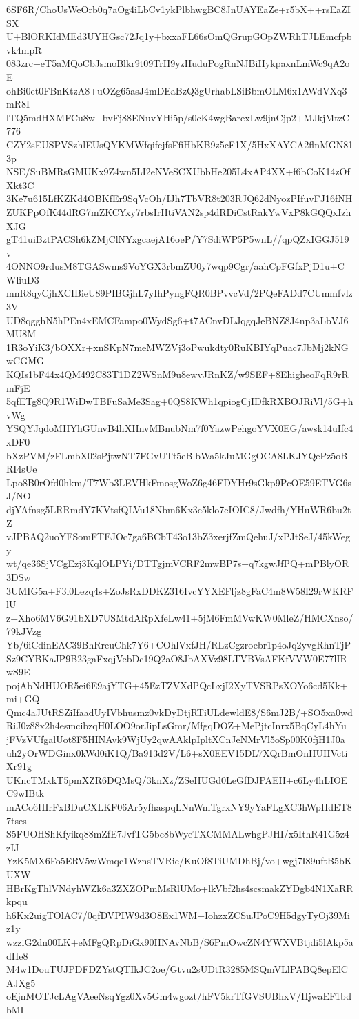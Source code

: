 6SF6R/ChoUsWeOrb0q7aOg4iLbCv1ykPlbhwgBC8JnUAYEaZe+r5bX++rsEaZISX
U+BlORKIdMEd3UYHGsc72Jq1y+bxxaFL66sOmQGrupGOpZWRhTJLEmcfpbvk4mpR
083zrc+eT5aMQoCbJsmoBlkr9t09TrH9yzHuduPogRnNJBiHykpaxnLmWc9qA2oE
ohBi0et0FBnKtzA8+uOZg65asJ4mDEaBzQ3gUrhabLSiBbmOLM6x1AWdVXq3mR8I
lTQ5mdHXMFCu8w+bvFj88ENuvYHi5p/s0cK4wgBarexLw9jnCjp2+MJkjMtzC776
CZY2sEUSPVSzhlEUsQYKMWfqifcjfsFfiHbKB9z5cF1X/5HxXAYCA2flnMGN813p
NSE/SuBMRsGMUKx9Z4wn5LI2eNVeSCXUbbHe205L4xAP4XX+f6bCoK14zOfXkt3C
3Ke7u615LfKZKd4OBKfEr9SqVcOh/IJh7TbVR8t203RJQ62dNyozPIfuvFJ16fNH
ZUKPpOfK44dRG7mZKCYxy7rbsIrHtiVAN2sp4dRDiCstRakYwVxP8kGQQxIzhXJG
gT41uiBztPACSh6kZMjClNYxgcaejA16oeP/Y7SdiWP5P5wnL//qpQZxIGGJ519v
4ONNO9rdusM8TGASwms9VoYGX3rbmZU0y7wqp9Cgr/aahCpFGfxPjD1u+CWliuD3
mnR8qyCjhXCIBieU89PIBGjhL7yIhPyngFQR0BPvvcVd/2PQeFADd7CUmmfvlz3V
UD8qgghN5hPEn4xEMCFampo0WydSg6+t7ACnvDLJqgqJeBNZ8J4np3aLbVJ6MU8M
1R3oYiK3/bOXXr+xnSKpN7meMWZVj3oPwukdty0RuKBIYqPuac7JbMj2kNGwCGMG
KQIs1bF44x4QM492C83T1DZ2WSnM9u8ewvJRnKZ/w9SEF+8EhigheoFqR9rRmFjE
5qfETg8Q9R1WiDwTBFuSaMe3Sag+0QS8KWh1qpiogCjIDfkRXBOJRiVl/5G+hvWg
YSQYJqdoMHYhGUnvB4hXHnvMBnubNm7f0YazwPehgoYVX0EG/awsk14uIfc4xDF0
bXzPVM/zFLmbX02sPjtwNT7FGvUTt5eBlbWa5kJuMGgOCA8LKJYQePz5oBRI4sUe
Lpo8B0rOfd0hkm/T7Wb3LEVHkFmosgWoZ6g46FDYHr9sGkp9PcOE59ETVG6sJ/NO
djYAfnsg5LRRmdY7KVtsfQLVu18Nbm6Kx3c5klo7eIOIC8/Jwdfh/YHuWR6bu2tZ
vJPBAQ2uoYFSomFTEJOc7ga6BCbT43o13bZ3xerjfZmQehuJ/xPJtSeJ/45kWegy
wt/qe36SjVCgEzj3KqlOLPYi/DTTgjmVCRF2mwBP7s+q7kgwJfPQ+mPBlyOR3DSw
3UMIG5a+F3l0Lezq4s+ZoJsRxDDKZ316IvcYYXEFljz8gFaC4m8W58I29rWKRFlU
z+Xho6MV6G91bXD7USMtdARpXfeLw41+5jM6FmMVwKW0MleZ/HMCXnso/79kJVzg
Yb/6iCdinEAC39BhRreuChk7Y6+COhlVxfJH/RLzCgzroebr1p4oJq2yvgRhnTjP
Sz9CYBKaJP9B23gaFxqjVebDc19Q2aO8JbAXVz98LTVBVsAFKfVVW0E77lIRwS9E
pojAbNdHUOR5ei6E9ajYTG+45EzTZVXdPQcLxjI2XyTVSRPsXOYo6cd5Kk+mi+GQ
Qmc4aJUtRSZiIfaadUyIVbhusmz0vkDyDtjRTiULdewldE8/S6mJ2B/+SO5xa0wd
RiJ0z88x2h4esmcibzqH0LOO9orJipLsGmr/MfgqDOZ+MePjtcInrx5BqCyL4hYu
jFVzVUfgalUot8F5HINAvk9WjUy2qwAAklpIpltXCnJeNMrVl5oSp00K0fjH1J0a
uh2yOrWDGinx0kWd0iK1Q/Ba913d2V/L6+sX0EEV15DL7XQrBmOnHUHVctiXr91g
UKncTMxkT5pmXZR6DQMsQ/3knXz/ZSeHUGd0LeGfDJPAEH+c6Ly4hLIOEC9wIBtk
mACo6HIrFxBDuCXLKF06Ar5yfhaspqLNnWmTgrxNY9yYaFLgXC3hWpHdET87tses
S5FUOHShKfyikq88mZfE7JvfTG5bc8bWyeTXCMMALwhgPJHI/x5IthR41G5z4zIJ
YzK5MX6Fo5ERV5wWmqc1WznsTVRie/KuOf8TiUMDhBj/vo+wgj7I89uftB5bKUXW
HBrKgThlVNdyhWZk6a3ZXZOPmMsRlUMo+lkVbf2hs4scsmakZYDgb4N1XaRRkpqu
h6Kx2uigTOlAC7/0qfDVPIW9d3O8Ex1WM+IohzxZCSuJPoC9H5dgyTyOj39Miz1y
wzziG2dn00LK+eMFgQRpDiGx90HNAvNbB/S6PmOwcZN4YWXVBtjdi5lAkp5adHe8
M4w1DouTUJPDFDZYstQTIkJC2oe/Gtvu2sUDtR3285MSQmVLlPABQ8epElCAJXg5
oEjnMOTJcLAgVAeeNsqYgz0Xv5Gm4wgozt/hFV5krTfGVSUBhxV/HjwaEF1bdbMI
